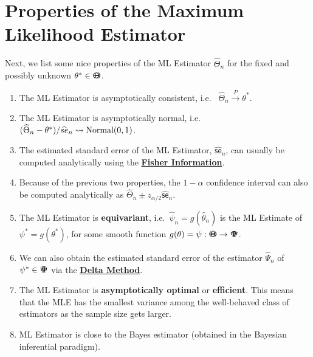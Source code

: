 \section{Properties of the Maximum Likelihood Estimator}\label{S:PropsMLE}
Next, we list some nice properties of the ML Estimator $\widehat{\Theta}_n$ for the fixed and possibly unknown $\theta^* \in {\Theta}\mspace{-11 mu}{\Theta}$.
\begin{enumerate}
\item The ML Estimator is asymptotically consistent, i.e.~
$\widehat{\Theta}_n \overset{P}{\longrightarrow} \theta^*$.
\item The ML Estimator is asymptotically normal, i.e.~
$(\widehat{\Theta}_n - \theta^*) / \widehat{se}_n \rightsquigarrow \mbox{{\rm Normal}}(0,1)$.
\item The estimated standard error of the ML Estimator, $\widehat{\mathsf{se}}_n$, can usually be computed analytically using the \hyperref[S:FisherInfo]{\bf Fisher Information}.
\item Because of the previous two properties, the $1-\alpha$ confidence interval can also be computed analytically as $\widehat{\Theta}_n \pm z_{\alpha/2} \widehat{\mathsf{se}}_n$.
\item The ML Estimator is {\bf equivariant}, i.e.~$\widehat{\psi}_n=g(\widehat{\theta}_n)$ is the ML Estimate of $\psi^*=g(\theta^*)$, for some smooth function $g(\theta)=\psi: {\Theta}\mspace{-11 mu}{\Theta} \to {\Psi}\mspace{-11 mu}{\Psi}$.  
\item We can also obtain the estimated standard error of the estimator 
$\widehat{\Psi}_n$ of $\psi^* \in {\Psi}\mspace{-11 mu}{\Psi}$ via the \hyperref[S:DeltaMethod]{\bf Delta Method}.
\item The ML Estimator is {\bf asymptotically optimal} or {\bf efficient}.  This means that the MLE has the smallest variance among the well-behaved class of estimators as the sample size gets larger.
\item ML Estimator is close to the Bayes estimator (obtained in the Bayesian inferential paradigm).
\end{enumerate}

